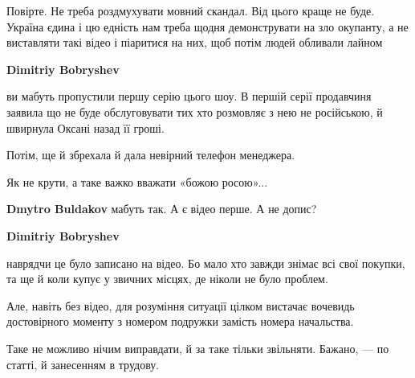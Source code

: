 \begin{itemize}
\begin{itemize}
Повірте. Не треба роздмухувати мовний скандал. Від цього краще не буде. Україна
єдина і цю едність нам треба щодня демонструвати на зло окупанту, а не
виставляти такі відео і піаритися на них, щоб потім людей обливали лайном

 
\textbf{Dimitriy Bobryshev} 

ви мабуть пропустили першу серію цього шоу. В першій серії продавчиня заявила
що не буде обслуговувати тих хто розмовляє з нею не російською, й швирнула
Оксані назад її гроші.

Потім, ще й збрехала й дала невірний телефон менеджера.

Як не крути, а таке важко вважати «божою росою»...

 
\textbf{Dmytro Buldakov} мабуть так. А є відео перше. А не допис?

 
\textbf{Dimitriy Bobryshev} 

наврядчи це було записано на відео. Бо мало хто завжди знімає всі свої покупки,
та ще й коли купує у звичних місцях, де ніколи не було проблем.

Але, навіть без відео, для розуміння ситуації цілком вистачає вочевидь
достовірного моменту з номером подружки замість номера начальства.

Таке не можливо нічим виправдати, й за таке тільки звільняти. Бажано, — по
статті, й занесенням в трудову.


 

\end{itemize}
\end{itemize}
